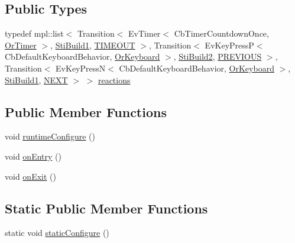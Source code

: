 \subsection*{Public Types}
\begin{DoxyCompactItemize}
\item 
typedef mpl\+::list$<$ Transition$<$ Ev\+Timer$<$ Cb\+Timer\+Countdown\+Once, \hyperlink{classsm__starcraft__ai_1_1OrTimer}{Or\+Timer} $>$, \hyperlink{structsm__starcraft__ai_1_1build__inner__states_1_1StiBuild1}{Sti\+Build1}, \hyperlink{structsm__starcraft__ai_1_1build__inner__states_1_1StiBuild3_1_1TIMEOUT}{T\+I\+M\+E\+O\+UT} $>$, Transition$<$ Ev\+Key\+PressP$<$ Cb\+Default\+Keyboard\+Behavior, \hyperlink{classsm__starcraft__ai_1_1OrKeyboard}{Or\+Keyboard} $>$, \hyperlink{structsm__starcraft__ai_1_1build__inner__states_1_1StiBuild2}{Sti\+Build2}, \hyperlink{structsm__starcraft__ai_1_1build__inner__states_1_1StiBuild3_1_1PREVIOUS}{P\+R\+E\+V\+I\+O\+US} $>$, Transition$<$ Ev\+Key\+PressN$<$ Cb\+Default\+Keyboard\+Behavior, \hyperlink{classsm__starcraft__ai_1_1OrKeyboard}{Or\+Keyboard} $>$, \hyperlink{structsm__starcraft__ai_1_1build__inner__states_1_1StiBuild1}{Sti\+Build1}, \hyperlink{structsm__starcraft__ai_1_1build__inner__states_1_1StiBuild3_1_1NEXT}{N\+E\+XT} $>$ $>$ \hyperlink{structsm__starcraft__ai_1_1build__inner__states_1_1StiBuild3_a2b857ab01ffed639b605c5931f610676}{reactions}
\end{DoxyCompactItemize}
\subsection*{Public Member Functions}
\begin{DoxyCompactItemize}
\item 
void \hyperlink{structsm__starcraft__ai_1_1build__inner__states_1_1StiBuild3_a8704c84513a0083bebca0cd42beed29b}{runtime\+Configure} ()
\item 
void \hyperlink{structsm__starcraft__ai_1_1build__inner__states_1_1StiBuild3_aa553262d3b05d3e719365fba804cbfe8}{on\+Entry} ()
\item 
void \hyperlink{structsm__starcraft__ai_1_1build__inner__states_1_1StiBuild3_a90b32bda2dd59828e21cf8bf63d182cf}{on\+Exit} ()
\end{DoxyCompactItemize}
\subsection*{Static Public Member Functions}
\begin{DoxyCompactItemize}
\item 
static void \hyperlink{structsm__starcraft__ai_1_1build__inner__states_1_1StiBuild3_a20b4866fcfb1434d4cf862a5f511bbf8}{static\+Configure} ()
\end{DoxyCompactItemize}
